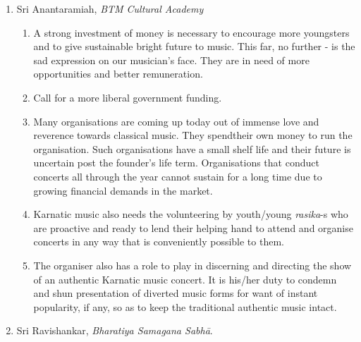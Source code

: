 \begin{enumerate}
\itemsep=0pt

 \item Sri Anantaramiah, \textit{BTM Cultural Academy}
 
\begin{enumerate}
\itemsep=0pt

 \item A strong investment of money is necessary to encourage more youngsters and to give sustainable bright future to music. This far, no further - is the sad expression on our musician’s face. They are in need of more opportunities and better remuneration.

 \item Call for a more liberal government funding.

 \item Many organisations are coming up today out of immense love and reverence towards classical music. They spend\break their own money to run the organisation. Such organisations have a small shelf life and their future is uncertain post the founder’s life term. Organisations that conduct concerts all through the year cannot sustain for a long time due to growing financial demands in the market.

 \item Karnatic music also needs the volunteering by youth/young \textit{rasika}-s who are proactive and ready to lend their helping hand to attend and organise concerts in any way that is conveniently possible to them.

 \item The organiser also has a role to play in discerning and directing the show of an authentic Karnatic music concert. It is his/her duty to condemn and shun presentation of diverted music forms for want of instant popularity, if any, so as to keep the traditional authentic music intact.
\end{enumerate}


 \item Sri Ravishankar, \textit{Bharatiya Samagana Sabhā}.
 
\begin{enumerate}
\itemsep=0pt


\end{enumerate}
\end{enumerate}

